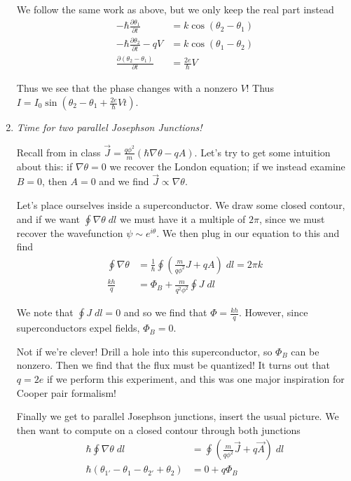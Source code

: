 \documentclass[10pt]{report}
\newcommand{\pd}[2]{\frac{\partial #1}{\partial#2}}
\begin{document}
\begin{enumerate}[1.]
        We follow the same work as above, but we only keep the real part instead
        \begin{align}
            -\hbar \pd{\theta_1}{t} &= k\cos\left( \theta_2 - \theta_1 \right)\\
            -\hbar \pd{\theta_2}{t} -qV &= k\cos\left( \theta_1 - \theta_2 \right)\\
            \pd{\left( \theta_2 - \theta_1 \right)}{t} &= \frac{2e}{\hbar}V
        \end{align}

        Thus we see that the phase changes with a nonzero $V$! Thus $I = I_0\sin\left( \theta_2 - \theta_1 + \frac{2e}{\hbar}Vt \right)$. 

    \item \emph{Time for two parallel Josephson Junctions!}

        Recall from in class $\vec{J} = \frac{q\phi^2}{m}\left( \hbar \nabla \theta - qA \right)$. Let's try to get some intuition about this: if $\nabla\theta = 0$ we recover the London equation; if we instead examine $B = 0$, then $A=0$ and we find $\vec{J} \propto \nabla \theta$.

        Let's place ourselves inside a superconductor. We draw some closed contour, and if we want $\oint \nabla \theta\;dl$ we must have it a multiple of  $2\pi$, since we must recover the wavefunction $\psi \sim e^{i\theta}$. We then plug in our equation to this and find
        \begin{align}
            \oint \nabla\theta  &= \frac{1}{\hbar}\oint \left( \frac{m}{q\phi^2}J + qA \right)\;dl = 2\pi k\\
            \frac{kh}{q} &= \Phi_B + \frac{m}{q^2\phi^2}\oint J\;dl
        \end{align}

        We note that $\oint J\;dl = 0$ and so we find that $\Phi = \frac{kh}{q}$. However, since superconductors expel fields, $\Phi_B = 0$.

        Not if we're clever! Drill a hole into this superconductor, so $\Phi_B$ can be nonzero. Then we find that the flux must be quantized! It turns out that $q=2e$ if we perform this experiment, and this was one major inspiration for Cooper pair formalism!

        Finally we get to parallel Josephson junctions, insert the usual picture. We then want to compute on a closed contour through both junctions
        \begin{align}
            \hbar\oint \nabla \theta\;dl &= \oint \left( \frac{m}{q\phi^2}\vec{J} + q\vec{A} \right)\;dl\\
            \hbar\left( \theta_{1'} - \theta_1 - \theta_{2'} + \theta_2 \right) &= 0 + q\Phi_B
        \end{align}


\end{enumerate}
\end{document}
